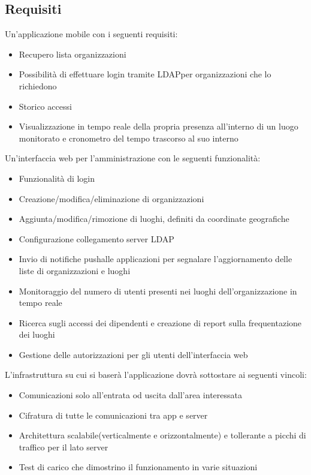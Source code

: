 \subsection{Requisiti}
Un'applicazione mobile con i seguenti requisiti:
\begin{itemize}
	\item Recupero lista organizzazioni
	\item Possibilità di effettuare login tramite LDAP\glo per organizzazioni che lo richiedono
	\item Storico accessi
	\item Visualizzazione in tempo reale della propria presenza all'interno di un luogo monitorato e cronometro del tempo trascorso al suo interno
\end{itemize}
Un'interfaccia web per l'amministrazione con le seguenti funzionalità:
\begin{itemize}
	\item Funzionalità di login
	\item Creazione/modifica/eliminazione di organizzazioni
	\item Aggiunta/modifica/rimozione di luoghi, definiti da coordinate geografiche
	\item Configurazione collegamento server LDAP\glo
	\item Invio di notifiche push\glosp alle applicazioni per segnalare l'aggiornamento delle liste di organizzazioni e luoghi
	\item Monitoraggio del numero di utenti presenti nei luoghi dell'organizzazione in tempo reale
	\item Ricerca sugli accessi dei dipendenti e creazione di report sulla frequentazione dei luoghi
	\item Gestione delle autorizzazioni per gli utenti dell'interfaccia web
\end{itemize}
L'infrastruttura su cui si baserà l'applicazione dovrà sottostare ai seguenti vincoli:
\begin{itemize}
	\item Comunicazioni solo all'entrata od uscita dall'area interessata
	\item Cifratura di tutte le comunicazioni tra app e server
	\item Architettura scalabile\glosp (verticalmente e orizzontalmente) e tollerante a picchi di traffico per il lato server
	\item Test di carico che dimostrino il funzionamento in varie situazioni
\end{itemize}

